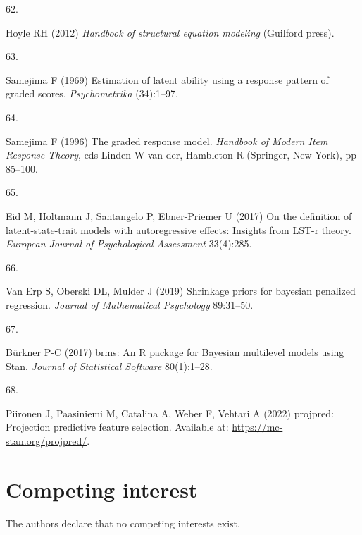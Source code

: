 \documentclass[
  man,floatsintext]{apa6}
\newlength{\cslhangindent}
\newlength{\csllabelwidth}
\newlength{\cslentryspacingunit} %
\newenvironment{CSLReferences}[2] %
 {%
  \setlength{\parindent}{0pt}
  \ifodd #1
  \let\oldpar\par
  \def\par{\hangindent=\cslhangindent\oldpar}
  \fi
  \setlength{\parskip}{#2\cslentryspacingunit}
 }%
 {}
\newcommand{\CSLLeftMargin}[1]{\parbox[t]{\csllabelwidth}{#1}}
\newcommand{\CSLRightInline}[1]{\parbox[t]{\linewidth - \csllabelwidth}{#1}\break}
\begin{document}
\begin{CSLReferences}{0}{0}
\leavevmode{}%
\CSLLeftMargin{62. }%
\CSLRightInline{Hoyle RH (2012) \emph{Handbook of structural equation modeling} (Guilford press).}

\leavevmode{}%
\CSLLeftMargin{63. }%
\CSLRightInline{Samejima F (1969) Estimation of latent ability using a response pattern of graded scores. \emph{Psychometrika} (34):1--97.}

\leavevmode{}%
\CSLLeftMargin{64. }%
\CSLRightInline{Samejima F (1996) The graded response model. \emph{Handbook of Modern Item Response Theory}, eds Linden W van der, Hambleton R (Springer, New York), pp 85--100.}

\leavevmode{}%
\CSLLeftMargin{65. }%
\CSLRightInline{Eid M, Holtmann J, Santangelo P, Ebner-Priemer U (2017) On the definition of latent-state-trait models with autoregressive effects: Insights from LST-r theory. \emph{European Journal of Psychological Assessment} 33(4):285.}

\leavevmode{}%
\CSLLeftMargin{66. }%
\CSLRightInline{Van Erp S, Oberski DL, Mulder J (2019) Shrinkage priors for bayesian penalized regression. \emph{Journal of Mathematical Psychology} 89:31--50.}

\leavevmode{}%
\CSLLeftMargin{67. }%
\CSLRightInline{Bürkner P-C (2017) {brms}: An {R} package for {Bayesian} multilevel models using {Stan}. \emph{Journal of Statistical Software} 80(1):1--28.}

\leavevmode{}%
\CSLLeftMargin{68. }%
\CSLRightInline{Piironen J, Paasiniemi M, Catalina A, Weber F, Vehtari A (2022) {projpred}: Projection predictive feature selection. Available at: \url{https://mc-stan.org/projpred/}.}

\end{CSLReferences}

\endgroup

\newpage

\hypertarget{competing-interest}{%
\section{Competing interest}\label{competing-interest}}

The authors declare that no competing interests exist.
\end{document}
